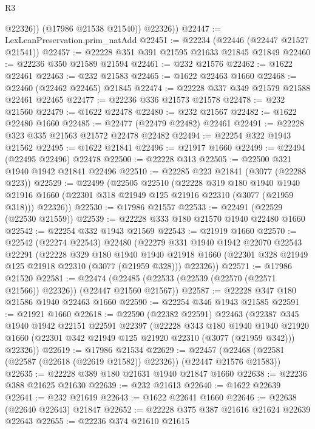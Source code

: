 \begin{lexlean}{R3}
\begin{coremodule}
              @22326))
          (@17986 @21538 @21540))
        @22326))
@22447 := LexLeanPreservation.prim_natAdd
@22451 := @22234 (@22446 (@22447 @21527 @21541))
@22457 := @22228 @351 @391 @21595 @21633 @21845 @21849
@22460 := @22236 @350 @21589 @21594
@22461 := @232 @21576
@22462 := @1622 @22461
@22463 := @232 @21583
@22465 := @1622 @22463 @1660
@22468 := @22460 (@22462 @22465) @21845
@22474 := @22228 @337 @349 @21579 @21588 @22461 @22465
@22477 := @22236 @336 @21573 @21578
@22478 := @232 @21560
@22479 := @1622 @22478
@22480 := @232 @21567
@22482 := @1622 @22480 @1660
@22485 := @22477 (@22479 @22482) @22461
@22491 := @22228 @323 @335 @21563 @21572 @22478 @22482
@22494 := @22254 @322 @1943 @21562
@22495 := @1622 @21841
@22496 := @21917 @1660
@22499 := @22494 (@22495 @22496) @22478
@22500 := @22228 @313
@22505 := @22500 @321 @1940 @1942 @21841 @22496
@22510 := @22285 @223 @21841 (@3077 (@22288 @223))
@22529 := @22499
    (@22505
      @22510
      (@22228
        @319
        @180
        @1940
        @1940
        @21916
        @1660
        (@22301 @318 @21949 @125 @21916 @22310 (@3077 (@21959 @318)))
        @22326))
@22530 := @17986 @21557
@22533 := @22491 (@22529 (@22530 @21559))
@22539 := @22228 @333 @180 @21570 @1940 @22480 @1660
@22542 := @22254 @332 @1943 @21569
@22543 := @21919 @1660
@22570 := @22542
    (@22274 @22543)
    @22480
    (@22279
      @331
      @1940
      @1942
      @22070
      @22543
      @22291
      (@22228
        @329
        @180
        @1940
        @1940
        @21918
        @1660
        (@22301 @328 @21949 @125 @21918 @22310 (@3077 (@21959 @328)))
        @22326))
@22571 := @17986 @21520
@22581 := @22474 (@22485 (@22533 (@22539 (@22570 (@22571 @21566)) @22326)) (@22447 @21560 @21567))
@22587 := @22228 @347 @180 @21586 @1940 @22463 @1660
@22590 := @22254 @346 @1943 @21585
@22591 := @21921 @1660
@22618 := @22590
    (@22382 @22591)
    @22463
    (@22387
      @345
      @1940
      @1942
      @22151
      @22591
      @22397
      (@22228
        @343
        @180
        @1940
        @1940
        @21920
        @1660
        (@22301 @342 @21949 @125 @21920 @22310 (@3077 (@21959 @342)))
        @22326))
@22619 := @17986 @21534
@22629 := @22457 (@22468 (@22581 (@22587 (@22618 (@22619 @21582)) @22326)) (@22447 @21576 @21583))
@22635 := @22228 @389 @180 @21631 @1940 @21847 @1660
@22638 := @22236 @388 @21625 @21630
@22639 := @232 @21613
@22640 := @1622 @22639
@22641 := @232 @21619
@22643 := @1622 @22641 @1660
@22646 := @22638 (@22640 @22643) @21847
@22652 := @22228 @375 @387 @21616 @21624 @22639 @22643
@22655 := @22236 @374 @21610 @21615

\end{coremodule}
\end{lexlean}
